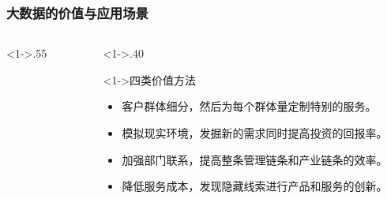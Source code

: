 \documentclass[10pt,aspectratio=43,mathserif,table]{beamer}
\begin{document}
\begin{frame}
	\frametitle{大数据的价值与应用场景}
	\begin{columns}[c]
		\begin{column}<1->{.55\textwidth}
			\begin{figure}[thpb]
				\centering
				\label{fig:campus}
			\end{figure}
		\end{column}
		\hfill
		\begin{column}<1->{.40\textwidth}
		\begin{block}<1->{四类价值方法}
			\begin{itemize}
				\item<1-> 客户群体细分，然后为每个群体量定制特别的服务。
				\item<1-> 模拟现实环境，发掘新的需求同时提高投资的回报率。
				\item<1-> 加强部门联系，提高整条管理链条和产业链条的效率。
				\item<1-> 降低服务成本，发现隐藏线索进行产品和服务的创新。
			\end{itemize}
		\end{block}
		\end{column}
	\end{columns}
\end{frame}
\end{document}
